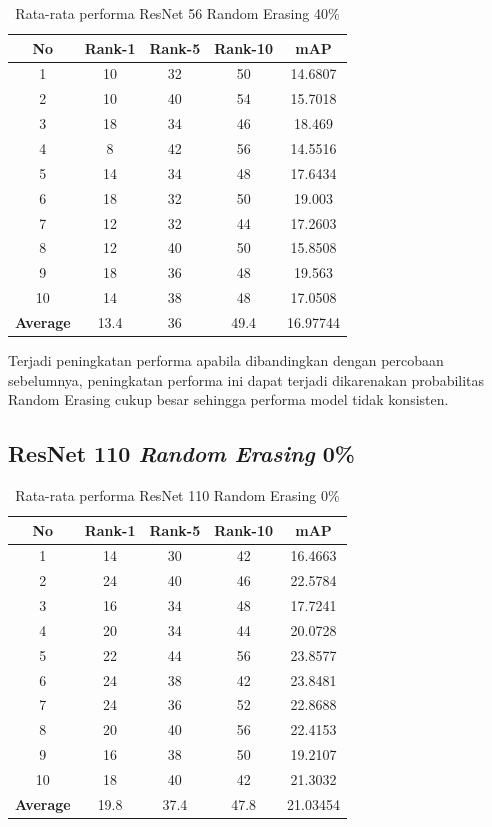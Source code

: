 \begin{longtable}{|c|c|c|c|c|}
	\caption{Rata-rata performa ResNet 56 Random Erasing 40\%}
	\label{tabel: 34}\\
	\hline
	\rowcolor[HTML]{C0C0C0}
	\textbf{No} &\textbf{Rank-1} & \textbf{Rank-5} & \textbf{Rank-10} & \textbf{mAP} \\
	\hline
	1 &10 &32 &50 &14.6807 \\
	2 &10 &40 &54 &15.7018 \\
	3 &18 &34 &46 &18.469 \\
	4 &8 &42 &56 &14.5516 \\
	5 &14 &34 &48 &17.6434 \\
	6 &18 &32 &50 &19.003 \\
	7 &12 &32 &44 &17.2603 \\
	8 &12 &40 &50 &15.8508 \\
	9 &18 &36 &48 &19.563 \\
	10 &14 &38 &48 &17.0508 \\
	\hline
	\textbf{Average} & 13.4 & 36 & 49.4 &16.97744 \\
	\hline
\end{longtable}

Terjadi peningkatan performa apabila dibandingkan dengan percobaan sebelumnya, peningkatan performa ini dapat terjadi dikarenakan probabilitas Random Erasing cukup besar sehingga performa model tidak konsisten.

\subsection{ResNet 110 \textit{Random Erasing} 0\%}
\begin{longtable}{|c|c|c|c|c|}
	\caption{Rata-rata performa ResNet 110 Random Erasing 0\%}
	\label{tabel: 36}\\
	\hline
	\rowcolor[HTML]{C0C0C0}
	\textbf{No} &\textbf{Rank-1} & \textbf{Rank-5} & \textbf{Rank-10} & \textbf{mAP} \\
	\hline
	1 &14 &30 &42 &16.4663 \\
	2 &24 &40 &46 &22.5784 \\
	3 &16 &34 &48 &17.7241 \\
	4 &20 &34 &44 &20.0728 \\
	5 &22 &44 &56 &23.8577 \\
	6 &24 &38 &42 &23.8481 \\
	7 &24 &36 &52 &22.8688 \\
	8 &20 &40 &56 &22.4153 \\
	9 &16 &38 &50 &19.2107 \\
	10 &18 &40 &42 &21.3032 \\
	\hline
	\textbf{Average} & 19.8 & 37.4 & 47.8 &21.03454 \\
	\hline
\end{longtable}

